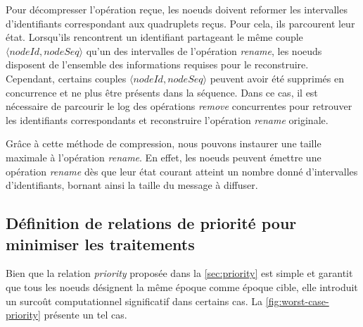 \documentclass[12pt]{thesul}
\newcommand{\trm}[1]{\mathit{#1}}
\begin{document}
Pour décompresser l'opération reçue, les noeuds doivent reformer les intervalles d'identifiants correspondant aux quadruplets reçus.
Pour cela, ils parcourent leur état.
Lorsqu'ils rencontrent un identifiant partageant le même couple $\langle\trm{nodeId}, \trm{nodeSeq}\rangle$ qu'un des intervalles de l'opération \emph{rename}, les noeuds disposent de l'ensemble des informations requises pour le reconstruire.
Cependant, certains couples $\langle\trm{nodeId}, \trm{nodeSeq}\rangle$ peuvent avoir été supprimés en concurrence et ne plus être présents dans la séquence.
Dans ce cas, il est nécessaire de parcourir le log des opérations \emph{remove} concurrentes pour retrouver les identifiants correspondants et reconstruire l'opération \emph{rename} originale.

Grâce à cette méthode de compression, nous pouvons instaurer une taille maximale à l'opération \emph{rename}.
En effet, les noeuds peuvent émettre une opération \emph{rename} dès que leur état courant atteint un nombre donné d'intervalles d'identifiants, bornant ainsi la taille du message à diffuser.

\subsection{Définition de relations de priorité pour minimiser les traitements}

\label{sec:alt-priority-relation}

Bien que la relation \emph{priority} proposée dans la \autoref{sec:priority} est simple et garantit que tous les noeuds désignent la même époque comme époque cible, elle introduit un surcoût computationnel significatif dans certains cas.
La \autoref{fig:worst-case-priority} présente un tel cas.
\end{document}
